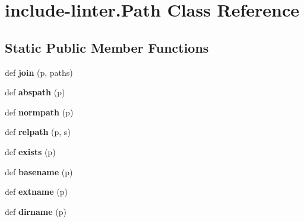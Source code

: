 \hypertarget{classinclude-linter_1_1Path}{}\section{include-\/linter.Path Class Reference}
\label{classinclude-linter_1_1Path}
\subsection*{Static Public Member Functions}
\begin{DoxyCompactItemize}
\item 
\mbox{\label{classinclude-linter_1_1Path_a3f269c96127637ecc11385d5dd717ceb}} 
def {\bfseries join} (p, paths)
\item 
\mbox{\label{classinclude-linter_1_1Path_a67131cb72904a4984c4deac014db9394}} 
def {\bfseries abspath} (p)
\item 
\mbox{\label{classinclude-linter_1_1Path_a3f582c404caa974def0890d078ece59d}} 
def {\bfseries normpath} (p)
\item 
\mbox{\label{classinclude-linter_1_1Path_a840e0daa536b8e17897b591b4673b07e}} 
def {\bfseries relpath} (p, s)
\item 
\mbox{\label{classinclude-linter_1_1Path_abeaa787b2bd6dd42c83c08b87e29826e}} 
def {\bfseries exists} (p)
\item 
\mbox{\label{classinclude-linter_1_1Path_a618903d12f4ccac62008def44d6218d3}} 
def {\bfseries basename} (p)
\item 
\mbox{\label{classinclude-linter_1_1Path_a8981e27310023930a313e0b74e4a2b9c}} 
def {\bfseries extname} (p)
\item 
\mbox{\label{classinclude-linter_1_1Path_a4f3857aa8fed071b72c4e10f3631a13f}} 
def {\bfseries dirname} (p)
\item 
\mbox{\label{classinclude-linter_1_1Path_a3f269c96127637ecc11385d5dd717ceb}} 

\end{DoxyCompactItemize}
